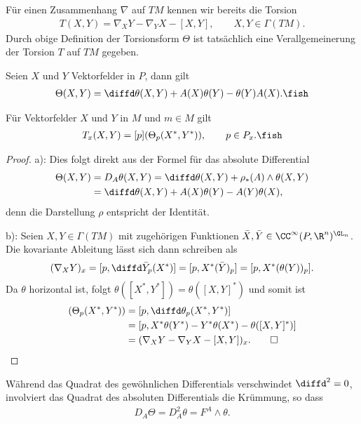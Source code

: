 \documentclass[%
	paper=a5,%
	fleqn,%
	DIV=18,%
	BCOR=0mm,
	fontsize=11pt,
	titlepage=false,%
	bibliography=totoc,
	DIV=18,%
	twoside=true,
	pdftitle=Riemannsche Geometrie,
	pdfauthor=Uwe Semmelmann,
	numbers=noendperiod]%
	{scrbook}
\begin{document}
Für einen Zusammenhang $\nabla$ auf $TM$ kennen wir bereits die Torsion
\begin{align*}
T(X,Y) = \nabla_X Y - \nabla_Y X - [X,Y],\qquad X,Y\in \Gamma(TM).
\end{align*}
Durch obige Definition der Torsionsform $\Theta$ ist tatsächlich eine
Verallgemeinerung der Torsion $T$ auf $TM$ gegeben.

\begin{lem}
\begin{propenum}
\item Seien $X$ und $Y$ Vektorfelder in $P$, dann gilt
\begin{align*}
\Theta(X,Y) = \diffd\theta(X,Y) + A(X)\theta(Y) - \theta(Y)A(X).\fish
\end{align*}
\item Für Vektorfelder $X$ und $Y$ in $M$ und $m\in M$ gilt
\begin{align*}
T_x(X,Y) = [p](\Theta_p(X^*,Y^*)),\qquad p\in P_x.\fish
\end{align*}
\end{propenum}
\end{lem}
\begin{proof}
a): Dies folgt direkt aus der Formel für das absolute Differential
\begin{align*}
\Theta(X,Y) &= D_A \theta(X,Y) = 
\diffd \theta(X,Y) + \rho_*(A)\wedge \theta(X,Y)\\
&= \diffd \theta(X,Y) + A(X)\theta(Y) - A(Y)\theta(X), 
\end{align*}
denn die Darstellung $\rho$ entspricht der Identität.

b): Seien $X,Y\in\Gamma(TM)$ mit zugehörigen Funktionen $\bar{X},\bar{Y}\in
\CC^\infty(P,\R^n)^{\GL_n}$. Die kovariante Ableitung lässt sich dann schreiben
als
\begin{align*}
(\nabla_X Y)_x = [p,\diffd \bar{Y}_p(X^*)] = [p,X^*(\bar{Y})_p]
= [p,X^*(\theta(Y))_p].
\end{align*}
Da $\theta$ horizontal ist, folgt $\theta([X^*,Y^*]) = \theta([X,Y]^*)$ und
somit ist
\begin{align*}
[p](\Theta_p(X^*,Y^*)) &= [p,\diffd\theta_p(X^*,Y^*)]\\
&= [p,X^*\theta(Y^*)-Y^*\theta(X^*)-\theta([X,Y]^*)]\\
&= (\nabla_X Y - \nabla_Y X - [X,Y])_x.\qed
\end{align*}
\end{proof}

Während das Quadrat des gewöhnlichen Differentials verschwindet $\diffd^2 = 0$,
involviert das Quadrat des absoluten Differentials die Krümmung, so dass
\begin{align*}
D_A \Theta = D_A^2 \theta = F^A\wedge \theta.
\end{align*}
\end{document}
